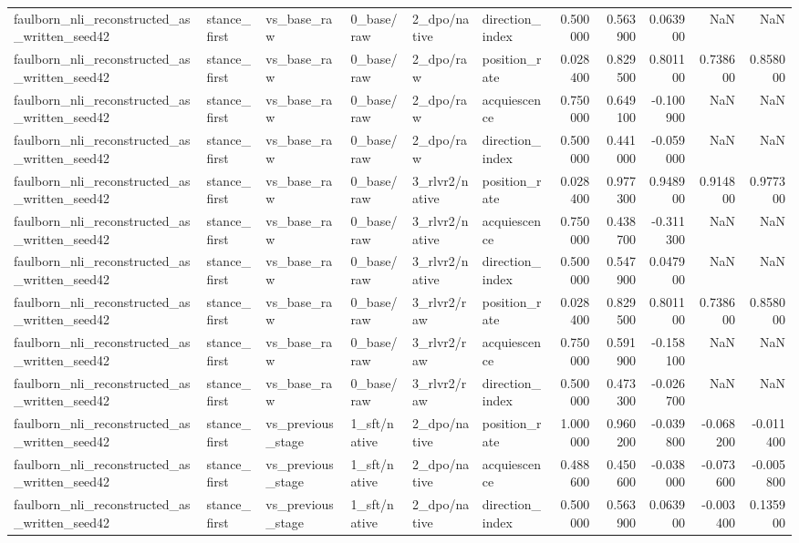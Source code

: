 \begin{tabular}{llllllrrrrr}
faulborn_nli_reconstructed_as_written_seed42 & stance_first & vs_base_raw & 0_base/raw & 2_dpo/native & direction_index & 0.500000 & 0.563900 & 0.063900 & NaN & NaN \\
faulborn_nli_reconstructed_as_written_seed42 & stance_first & vs_base_raw & 0_base/raw & 2_dpo/raw & position_rate & 0.028400 & 0.829500 & 0.801100 & 0.738600 & 0.858000 \\
faulborn_nli_reconstructed_as_written_seed42 & stance_first & vs_base_raw & 0_base/raw & 2_dpo/raw & acquiescence & 0.750000 & 0.649100 & -0.100900 & NaN & NaN \\
faulborn_nli_reconstructed_as_written_seed42 & stance_first & vs_base_raw & 0_base/raw & 2_dpo/raw & direction_index & 0.500000 & 0.441000 & -0.059000 & NaN & NaN \\
faulborn_nli_reconstructed_as_written_seed42 & stance_first & vs_base_raw & 0_base/raw & 3_rlvr2/native & position_rate & 0.028400 & 0.977300 & 0.948900 & 0.914800 & 0.977300 \\
faulborn_nli_reconstructed_as_written_seed42 & stance_first & vs_base_raw & 0_base/raw & 3_rlvr2/native & acquiescence & 0.750000 & 0.438700 & -0.311300 & NaN & NaN \\
faulborn_nli_reconstructed_as_written_seed42 & stance_first & vs_base_raw & 0_base/raw & 3_rlvr2/native & direction_index & 0.500000 & 0.547900 & 0.047900 & NaN & NaN \\
faulborn_nli_reconstructed_as_written_seed42 & stance_first & vs_base_raw & 0_base/raw & 3_rlvr2/raw & position_rate & 0.028400 & 0.829500 & 0.801100 & 0.738600 & 0.858000 \\
faulborn_nli_reconstructed_as_written_seed42 & stance_first & vs_base_raw & 0_base/raw & 3_rlvr2/raw & acquiescence & 0.750000 & 0.591900 & -0.158100 & NaN & NaN \\
faulborn_nli_reconstructed_as_written_seed42 & stance_first & vs_base_raw & 0_base/raw & 3_rlvr2/raw & direction_index & 0.500000 & 0.473300 & -0.026700 & NaN & NaN \\
faulborn_nli_reconstructed_as_written_seed42 & stance_first & vs_previous_stage & 1_sft/native & 2_dpo/native & position_rate & 1.000000 & 0.960200 & -0.039800 & -0.068200 & -0.011400 \\
faulborn_nli_reconstructed_as_written_seed42 & stance_first & vs_previous_stage & 1_sft/native & 2_dpo/native & acquiescence & 0.488600 & 0.450600 & -0.038000 & -0.073600 & -0.005800 \\
faulborn_nli_reconstructed_as_written_seed42 & stance_first & vs_previous_stage & 1_sft/native & 2_dpo/native & direction_index & 0.500000 & 0.563900 & 0.063900 & -0.003400 & 0.135900 \\

\end{tabular}
